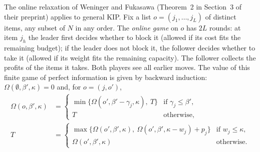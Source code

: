 The online relaxation of Weninger and Fukasawa\cite{weninger2023fast,weninger2025fast}
(Theorem~2 in Section~3 of their preprint) applies to general KIP. Fix a list
$o=(j_1,\dots,j_L)$ of distinct items, any subset of $N$ in any order. The
\emph{online game} on $o$ has $2L$ rounds: at item $j_h$ the leader first
decides whether to block it (allowed if its cost fits the remaining budget);
if the leader does not block it, the follower decides whether to take it
(allowed if its weight fits the remaining capacity). The follower collects
the profits of the items it takes. Both players see all earlier moves. The
value of this finite game of perfect information is given by backward
induction: $\Omega(\emptyset,\beta',\kappa)=0$ and, for $o=(j,o')$,
\begin{align*}
  \Omega(o,\beta',\kappa)&=
  \begin{cases}\min\{\Omega(o',\beta'-\gamma_j,\kappa),\ T\} & \text{if }\gamma_j\le\beta',\\
  T & \text{otherwise,}\end{cases}\\
  T&=\begin{cases}\max\{\Omega(o',\beta',\kappa),\ \Omega(o',\beta',\kappa-w_j)+p_j\} & \text{if }w_j\le\kappa,\\
  \Omega(o',\beta',\kappa) & \text{otherwise.}\end{cases}
\end{align*}

